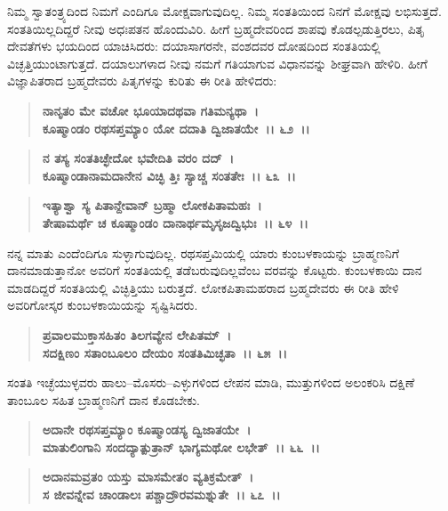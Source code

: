 ನಿಮ್ಮ ಸ್ವಾತಂತ್ರ್ಯದಿಂದ ನಿಮಗೆ ಎಂದಿಗೂ ಮೋಕ್ಷವಾಗುವುದಿಲ್ಲ. ನಿಮ್ಮ ಸಂತತಿಯಿಂದ ನಿನಗೆ ಮೋಕ್ಷವು ಲಭಿಸುತ್ತದೆ. ಸಂತತಿಯಿಲ್ಲದಿದ್ದರೆ ನೀವು ಅಧಃಪತನ ಹೊಂದುವಿರಿ. ಹೀಗೆ ಬ್ರಹ್ಮದೇವರಿಂದ ಶಾಪವು ಕೊಡಲ್ಪಡುತ್ತಿರಲು, ಪಿತೃ ದೇವತೆಗಳು ಭಯದಿಂದ ಯಾಚಿಸಿದರು: ದಯಾಸಾಗರನೇ, ವಂಶದವರ ದೋಷದಿಂದ ಸಂತತಿಯಲ್ಲಿ ವಿಚ್ಛತ್ತಿಯುಂಟಾಗುತ್ತದೆ. ದಯಾಲು\-ಗಳಾದ ನೀವು ನಮಗೆ ಗತಿಯಾಗುವ ವಿಧಾನವನ್ನು ಶೀಘ್ರವಾಗಿ ಹೇಳಿರಿ. ಹೀಗೆ ವಿಜ್ಞಾಪಿತರಾದ ಬ್ರಹ್ಮದೇವರು ಪಿತೃಗಳನ್ನು ಕುರಿತು ಈ ರೀತಿ ಹೇಳಿದರು:

\begin{verse}
\textbf{ನಾನೃತಂ ಮೇ ವಚೋ ಭೂಯಾದಥವಾ ಗತಿಮನ್ಯಥಾ~।}\\\textbf{ಕೂಷ್ಮಾಂಡಂ ರಥಸಪ್ತಮ್ಯಾಂ ಯೋ ದದಾತಿ ದ್ವಿಜಾತಯೇ~।। ೬೨~।। }
\end{verse}

\begin{verse}
\textbf{ನ ತಸ್ಯ ಸಂತತಿಚ್ಛೇದೋ ಭವೇದಿತಿ ವರಂ ದದ್~।}\\\textbf{ಕೂಷ್ಮಾಂಡಾನಾಮದಾನೇನ ವಿಚ್ಛಿ ತ್ತಿಃ ಸ್ಯಾಚ್ಚ ಸಂತತೇಃ~।। ೬೩~।। }
\end{verse}

\begin{verse}
\textbf{ಇತ್ಯಾಶ್ವಾ ಸ್ಯ ಪಿತಾನ್ದೇವಾನ್ ಬ್ರಹ್ಮಾ ಲೋಕಪಿತಾಮಹಃ~।}\\\textbf{ತೇಷಾಮರ್ಥೆ ಚ ಕೂಷ್ಮಾಂಡಂ ದಾನಾರ್ಥಮೃಸೃಜದ್ವಿಭುಃ~।। ೬೪~।।}
\end{verse}

ನನ್ನ ಮಾತು ಎಂದೆಂದಿಗೂ ಸುಳ್ಳಾಗುವುದಿಲ್ಲ. ರಥಸಪ್ತಮಿಯಲ್ಲಿ ಯಾರು ಕುಂಬಳ\-ಕಾಯನ್ನು ಬ್ರಾಹ್ಮಣನಿಗೆ ದಾನಮಾಡುತ್ತಾನೋ ಅವರಿಗೆ ಸಂತತಿಯಲ್ಲಿ ತಡೆಬರುವುದಿಲ್ಲವೆಂಬ ವರವನ್ನು ಕೊಟ್ಟರು. ಕುಂಬಳಕಾಯಿ ದಾನ ಮಾಡದಿದ್ದರೆ ಸಂತತಿಯಲ್ಲಿ ವಿಚ್ಛಿತ್ತಿಯು ಬರುತ್ತದೆ. ಲೋಕಪಿತಾಮಹರಾದ ಬ್ರಹ್ಮದೇವರು ಈ ರೀತಿ ಹೇಳಿ ಅವರಿಗೋಸ್ಕರ ಕುಂಬಳಕಾಯಿಯನ್ನು ಸೃಷ್ಟಿಸಿದರು.

\begin{verse}
\textbf{ಪ್ರವಾಲಮುಕ್ತಾಸಹಿತಂ ತಿಲಗವ್ಯೇನ ಲೇಪಿತಮ್~।}\\\textbf{ಸದಕ್ಷಿಣಂ ಸತಾಂಬೂಲಂ ದೇಯಂ ಸಂತತಿಮಿಚ್ಛತಾ~।। ೬೫~।।}
\end{verse}

ಸಂತತಿ ಇಚ್ಛೆಯುಳ್ಳವರು ಹಾಲು–ಮೊಸರು–ಎಳ್ಳುಗಳಿಂದ ಲೇಪನ ಮಾಡಿ, ಮುತ್ತುಗಳಿಂದ ಅಲಂಕರಿಸಿ ದಕ್ಷಿಣೆ ತಾಂಬೂಲ ಸಹಿತ ಬ್ರಾಹ್ಮಣನಿಗೆ ದಾನ ಕೊಡಬೇಕು.

\begin{verse}
\textbf{ಅದಾನೇ ರಥಸಪ್ತಮ್ಯಾಂ ಕೂಷ್ಮಾಂಡಸ್ಯ ದ್ವಿಜಾತಯೇ~।}\\\textbf{ಮಾತುಲಿಂಗಾನಿ ಸಂದದ್ಯಾತ್ಪುತ್ರಾನ್ ಭಾಗ್ಯಮಥೋ ಲಭೇತ್~।। ೬೬~।।} 
\end{verse}

\begin{verse}
\textbf{ಅದಾನಮವ್ರತಂ ಯಸ್ತು ಮಾಸಮೇತಂ ವ್ಯತಿಕ್ರಮೇತ್~।}\\\textbf{ಸ ಜೀವನ್ನೇವ ಚಾಂಡಾಲಃ ಪಶ್ಚಾದ್ರೌರವಮಶ್ನುತೇ~।। ೬೭~।। }
\end{verse}

